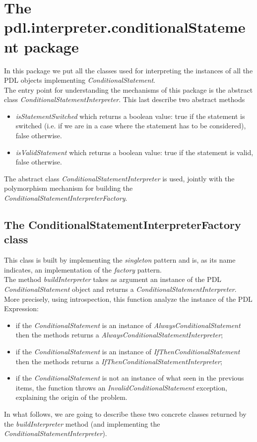 \documentclass[a4paper,11pt] {ivoa}
\begin{document}
\section{The pdl.interpreter.conditionalStatement package}
In this package we put all the classes used for interpreting the instances of all the PDL objects implementing {\it ConditionalStatement}.\\
The entry point for understanding the mechanisms of this package is the abstract class {\it ConditionalStatementInterpreter}. This last describe two abstract methods
\begin{itemize}
\item {\it isStatementSwitched} which returns a boolean value: true if the statement is switched (i.e. if we are in a case where the statement has to be considered), false otherwise.
\item {\it isValidStatement} which returns a boolean value: true if the statement is valid, false otherwise.
\end{itemize}
The abstract class {\it ConditionalStatementInterpreter} is used, jointly with the polymorphism mechanism for building the {\it ConditionalStatementInterpreterFactory}.

\subsection{The ConditionalStatementInterpreterFactory class}\label{statementFactory}
This class is built by implementing the {\it singleton} pattern and is, as its name indicates, an implementation of the {\it factory} pattern.\\
The method {\it buildInterpreter} takes as argument an instance of the PDL {\it ConditionalStatement} object and returns a {\it ConditionalStatementInterpreter}.
More precisely, using introspection, this function analyze the instance of the PDL Expression:
\begin{itemize}
\item if the {\it ConditionalStatement} is an instance of {\it AlwaysConditionalStatement} then the methods returns a {\it AlwaysConditionalStatementInterpreter};
\item if the {\it ConditionalStatement} is an instance of {\it IfThenConditionalStatement} then the methods returns a {\it IfThenConditionalStatementInterpreter};
\item if the {\it ConditionalStatement} is not an instance of what seen in the previous items, the function throws an {\it InvalidConditionalStatement} exception, explaining the origin of the problem.
\end{itemize} 
In what follows, we are going to describe these two concrete classes returned by the  {\it buildInterpreter} method (and implementing the {\it ConditionalStatementInterpreter}).
\end{document}

